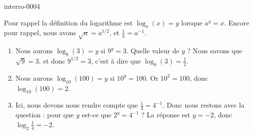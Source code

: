 
\begin{corrige}{interro-0004}

	Pour rappel la définition du logarithme est $\log_a(x)=y$ lorsque $a^y=x$. Encore pour rappel, nous avons $\sqrt{a}=a^{1/2}$, et $\frac{1}{ a }=a^{-1}$.

	\begin{enumerate}
		\item
			Nous aurons $\log_9(3)=y$ si $9^y=3$. Quelle valeur de $y$ ? Nous savons que $\sqrt{9}=3$, et donc $9^{1/2}=3$, c'est à dire que $\log_9(3)=\frac{ 1 }{2}$.
		\item
			Nous aurons $\log_{10}(100)=y$ si $10^y=100$. Or $10^2=100$, donc $\log_{10}(100)=2$.
		\item
			Ici, nous devons nous rendre compte que $\frac{1}{ 4 }=4^{-1}$. Donc nous restons avec la question : pour que $y$ est-ce que $2^y=4^{-1}$ ? La réponse est $y=-2$, donc $\log_2\frac{1}{ 4 }=-2$.

	\end{enumerate}

\end{corrige}
